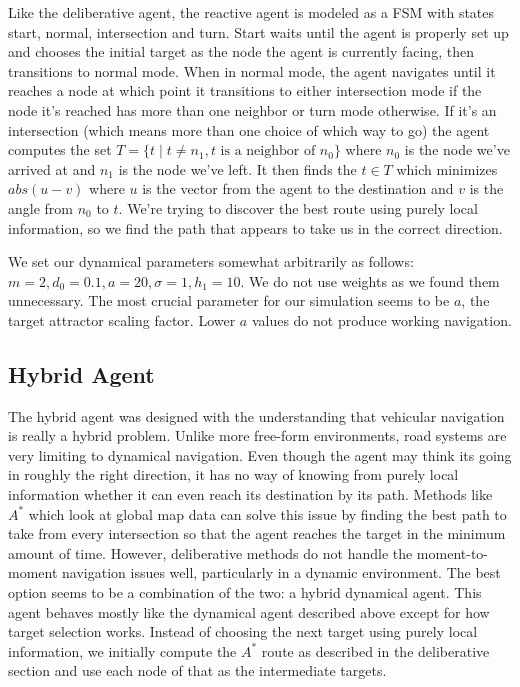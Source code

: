 \documentclass{article}
\begin{document}
Like the deliberative agent, the reactive agent is modeled
as a FSM with states start, normal, intersection and turn. Start
waits until the agent is properly set up and chooses the initial
target as the node the agent is currently facing, then transitions to
normal mode. When in normal mode, the agent navigates until it
reaches a node at which point it transitions to either intersection
mode if the node it's reached has more than one neighbor or turn mode
otherwise. If it's an intersection (which means more than one choice
of which way to go) the agent computes the set $T = \{t\;|\;t\neq
n_1,t \mbox{ is a neighbor of } n_0\}$ where $n_0$ is the node we've
arrived at and $n_1$ is the node we've left. It then finds the $t\in
T$ which minimizes $abs(u-v)$ where $u$ is the vector from the agent
to the destination and $v$ is the angle from $n_0$ to $t$. We're
trying to discover the best route using purely local information, so
we find the path that appears to take us in the correct direction.

We set our dynamical parameters somewhat arbitrarily as follows: $m =
2, d_0 = 0.1, a = 20, \sigma = 1, h_1 = 10$. We do not use weights as
we found them unnecessary. The most crucial parameter for our
simulation seems to be $a$, the target attractor scaling factor. Lower
$a$ values do not produce working navigation.

\subsection{Hybrid Agent}
The hybrid agent was designed with the understanding that vehicular
navigation is really a hybrid problem. Unlike more free-form
environments, road systems are very limiting to dynamical
navigation. Even though the agent may think its going in roughly the
right direction, it has no way of knowing from purely local
information whether it can even reach its destination by its
path. Methods like $A^*$ which look at global map data can solve this
issue by finding the best path to take from every intersection so that
the agent reaches the target in the minimum amount of time. However,
deliberative methods do not handle the moment-to-moment navigation
issues well, particularly in a dynamic environment. The best option
seems to be a combination of the two: a hybrid dynamical agent. This
agent behaves mostly like the dynamical agent described above except
for how target selection works. Instead of choosing the next target
using purely local information, we initially compute the $A^*$ route
as described in the deliberative section and use each node of that as
the intermediate targets.
\end{document}
